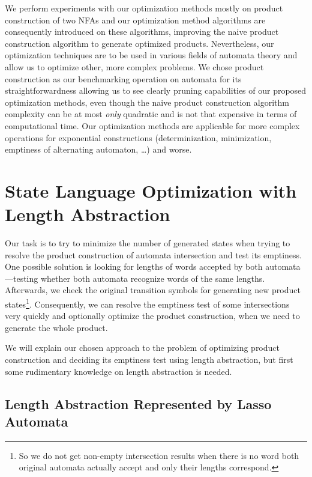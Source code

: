 We perform experiments with our optimization methods mostly on product construction of two NFAs and our optimization method algorithms are consequently introduced on these algorithms, improving the naive product construction algorithm to generate optimized products. Nevertheless, our optimization techniques are to be used in various fields of automata theory and allow us to optimize other, more complex problems. We chose product construction as our benchmarking operation on automata for its straightforwardness allowing us to see clearly pruning capabilities of our proposed optimization methods, even though the naive product construction algorithm complexity can be at most \emph{only} quadratic and is not that expensive in terms of computational time. Our optimization methods are applicable for more complex operations for exponential constructions (determinization, minimization, emptiness of alternating automaton, \ldots) and worse.


\section{State Language Optimization with Length Abstraction}

Our task is to try to minimize the number of generated states when trying to resolve the product construction of automata intersection and test its emptiness. One possible solution is looking for lengths of words accepted by both automata---testing whether both automata recognize words of the same lengths. Afterwards, we check the original transition symbols for generating new product states\footnote{So we do not get non-empty intersection results when there is no word both original automata actually accept and only their lengths correspond.}. Consequently, we can resolve the emptiness test of some intersections very quickly and optionally optimize the product construction, when we need to generate the whole product.

We will explain our chosen approach to the problem of optimizing product construction and deciding its emptiness test using length abstraction, but first some rudimentary knowledge on length abstraction is needed.

\subsection{Length Abstraction Represented by Lasso Automata} \label{sec:length_abstraction}

